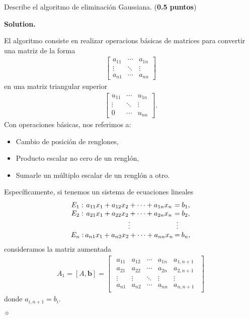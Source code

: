 \documentclass{article}
\theoremstyle{problemstyle}
\newenvironment{solution}{%
  \begin{mdframed}[linewidth=0.8pt,linecolor=Gray,backgroundcolor=Gray!5,roundcorner=5pt]%
  \noindent\textbf{Solution.}%
}{%
\hfill $ \diamond $ 
  \end{mdframed}%
}
\begin{document}
\begin{problem}
Describe el algoritmo de eliminaci\'on Gaussiana. (\textbf{0.5 puntos})
\end{problem}
\begin{solution}
	El algoritmo consiste en realizar operacions b\'asicas de matrices para convertir una matriz de la forma
	\begin{align*}
		\begin{bmatrix}
			a_{11} & \cdots & a_{1n} \\
			\vdots & \ddots & \vdots \\
			a_{n1} & \cdots & a_{nn}
		\end{bmatrix}
	\end{align*}
	en una matriz triangular superior
	\begin{align*}
		\begin{bmatrix}
			u_{11} & \cdots & u_{1n} \\
			\vdots & \ddots & \vdots \\
			0      & \cdots & u_{nn}
		\end{bmatrix}.
	\end{align*}
	Con operaciones b\'asicas, nos referimos a:
	\begin{itemize}
		\item Cambio de posici\'on de renglones,
		\item Producto escalar no cero de un rengl\'on,
		\item Sumarle un m\'ultiplo escalar de un rengl\'on a otro.
	\end{itemize}
	Espec\'ificamente, si tenemos un sistema de ecuaciones lineales
	\begin{align*}
		\arraycolsep=1pt
		\begin{array}{cccc}
			E_{1} : & a_{11}x_{1} + a_{12}x_{2} + \cdots + a_{1n}x_{n} & =      & b_{1}, \\
			E_{2} : & a_{21}x_{1} + a_{22}x_{2} + \cdots + a_{2n}x_{n} & =      & b_{2}, \\
			        & \vdots                                           & \vdots &        \\
			E_{n} : & a_{n1}x_{1} + a_{n2}x_{2} + \cdots + a_{nn}x_{n} & =      & b_{n},
		\end{array}
	\end{align*}
	consideramos la matriz aumentada
	\begin{align*}
		A_1 = [A,\mathbf{b}] =
		\begin{bmatrix}
			\begin{array}{cccc|c}
				a_{11} & a_{12} & \cdots & a_{1n} & a_{1,n+1} \\
				a_{21} & a_{22} & \cdots & a_{2n} & a_{2,n+1} \\
				\vdots & \vdots & \ddots & \vdots & \vdots    \\
				a_{n1} & a_{n2} & \cdots & a_{nn} & a_{n,n+1}
			\end{array}
		\end{bmatrix}
	\end{align*}
	donde $ a_{i, n+1} = b_{i} $.


\end{solution}
\end{document}

